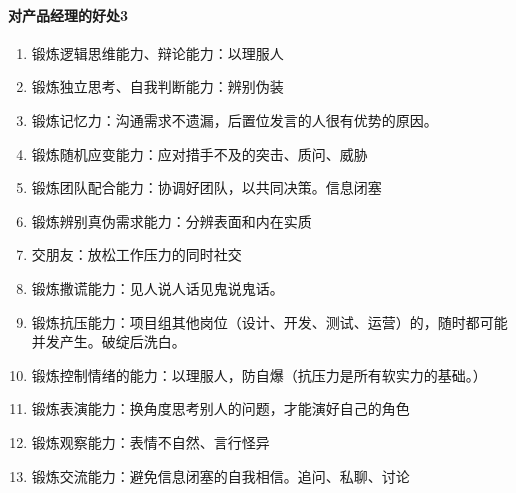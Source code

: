 \documentclass[letterpaper,11pt,english]{sphinxmanual}
\begin{document}
\paragraph{对产品经理的好处3\sphinxfootnotemark[626]}
\label{\detokenize{chapter_experience/jubensha:id7}}%
\begin{footnotetext}[626]\sphinxAtStartFootnote
{}
%
\end{footnotetext}\ignorespaces \begin{enumerate}
%
\item {} 
锻炼逻辑思维能力、辩论能力：以理服人

\item {} 
锻炼独立思考、自我判断能力：辨别伪装

\item {} 
锻炼记忆力：沟通需求不遗漏，后置位发言的人很有优势的原因。

\item {} 
锻炼随机应变能力：应对措手不及的突击、质问、威胁%
\begin{footnote}[627]\sphinxAtStartFootnote
{}
%
\end{footnote}

\item {} 
锻炼团队配合能力：协调好团队，以共同决策。信息闭塞

\item {} 
锻炼辨别真伪需求能力：分辨表面和内在实质

\item {} 
交朋友：放松工作压力的同时社交

\item {} 
锻炼撒谎能力：见人说人话见鬼说鬼话。

\item {} 
锻炼抗压能力：项目组其他岗位（设计、开发、测试、运营）的，随时都可能并发产生。破绽后洗白。

\item {} 
锻炼控制情绪的能力：以理服人，防自爆（抗压力是所有软实力的基础。）

\item {} 
锻炼表演能力：换角度思考别人的问题，才能演好自己的角色

\item {} 
锻炼观察能力：表情不自然、言行怪异%
\begin{footnote}[628]\sphinxAtStartFootnote
{}
%
\end{footnote}

\item {} 
锻炼交流能力：避免信息闭塞的自我相信。追问、私聊、讨论

\end{enumerate}
\end{document}
